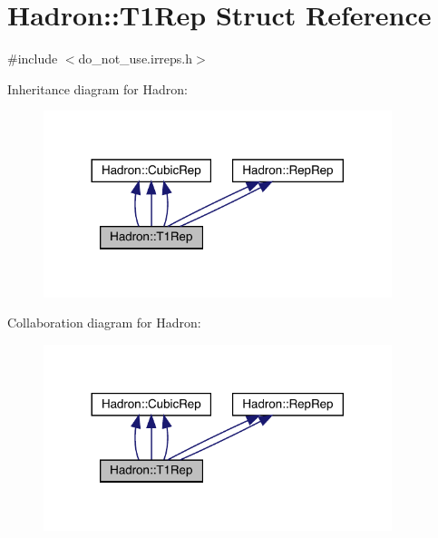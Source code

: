 \hypertarget{structHadron_1_1T1Rep}{}\section{Hadron\+:\+:T1\+Rep Struct Reference}
\label{structHadron_1_1T1Rep}


{\ttfamily \#include $<$do\+\_\+not\+\_\+use.\+irreps.\+h$>$}



Inheritance diagram for Hadron\+:
\nopagebreak
\begin{figure}[H]
\begin{center}
\leavevmode
\includegraphics[width=288pt]{d7/d7b/structHadron_1_1T1Rep__inherit__graph}
\end{center}
\end{figure}


Collaboration diagram for Hadron\+:
\nopagebreak
\begin{figure}[H]
\begin{center}
\leavevmode
\includegraphics[width=288pt]{d5/d6c/structHadron_1_1T1Rep__coll__graph}
\end{center}
\end{figure}
